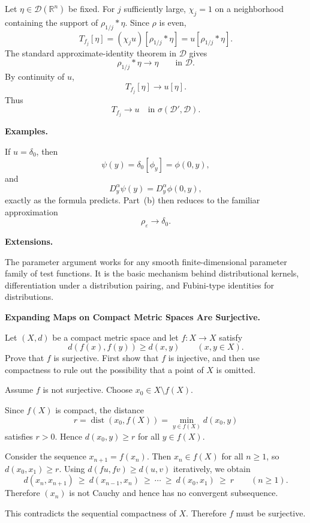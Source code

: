 \begin{solution}
Let \(\eta\in\mathcal D(\mathbb R^n)\) be fixed. For \(j\) sufficiently
large, \(\chi_j=1\) on a neighborhood containing the support of
\(\rho_{1/j}*\eta\). Since \(\rho\) is even,
\[
T_{f_j}[\eta]
=
(\chi_j u)[\rho_{1/j}*\eta]
=
u[\rho_{1/j}*\eta].
\]
The standard approximate-identity theorem in \(\mathcal D\) gives
\[
\rho_{1/j}*\eta
\longrightarrow
\eta
\qquad\text{in }\mathcal D.
\]
By continuity of \(u\),
\[
T_{f_j}[\eta]
\longrightarrow
u[\eta].
\]
Thus
\[
\boxed{
T_{f_j}\longrightarrow u
\quad\text{in }\sigma(\mathcal D',\mathcal D).}
\]

\medskip
\noindent\textbf{Examples.}

If \(u=\delta_0\), then
\[
\psi(y)
=
\delta_0[\phi_y]
=
\phi(0,y),
\]
and
\[
D_y^\alpha\psi(y)
=
D_y^\alpha\phi(0,y),
\]
exactly as the formula predicts. Part~(b) then reduces to the familiar
approximation
\[
\rho_\varepsilon\to\delta_0.
\]

\medskip
\noindent\textbf{Extensions.}

The parameter argument works for any smooth finite-dimensional parameter
family of test functions. It is the basic mechanism behind distributional
kernels, differentiation under a distribution pairing, and Fubini-type
identities for distributions.
\end{solution}

\begin{problem}[CP-II-0085]
\label{prob:cp-ii-0085}
\textbf{Expanding Maps on Compact Metric Spaces Are Surjective.}

\hspace*{1.5em}Let \((X,d)\) be a compact metric space and let \(f:X\to X\) satisfy
\[
d(f(x),f(y))\ge d(x,y)
\qquad(x,y\in X).
\]
Prove that \(f\) is surjective. First show that \(f\) is injective, and then use
compactness to rule out the possibility that a point of \(X\) is omitted.
\end{problem}

\begin{solution}
Assume \(f\) is not surjective. Choose \(x_0\in X\setminus f(X)\).

Since \(f(X)\) is compact, the distance
\[
r=\operatorname{dist}(x_0,f(X))=\min_{y\in f(X)} d(x_0,y)
\]
satisfies \(r>0\). Hence \(d(x_0,y)\ge r\) for all \(y\in f(X)\).

\smallskip

Consider the sequence \(x_{n+1}=f(x_n)\). Then \(x_n\in f(X)\) for all \(n\ge1\), so
\(d(x_0,x_1)\ge r\).
Using \(d(fu,fv)\ge d(u,v)\) iteratively, we obtain
\[
d(x_n,x_{n+1}) \ \ge\ d(x_{n-1},x_n) \ \ge \ \cdots \ \ge\ d(x_0,x_1)\ \ge\ r
\qquad (n\ge1).
\]
Therefore \((x_n)\) is not Cauchy and hence has no convergent subsequence.

\smallskip

This contradicts the sequential compactness of \(X\). Therefore \(f\) must be surjective.

\smallskip
\end{solution}

